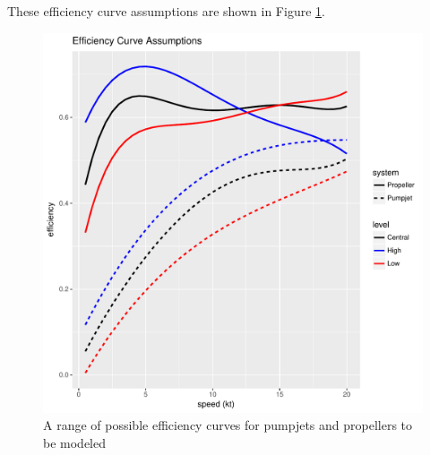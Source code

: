\documentclass{article}\usepackage[]{graphicx}\usepackage[]{color}
\makeatletter
\def\maxwidth{ %
  \ifdim\Gin@nat@width>\linewidth
    \linewidth
  \else
    \Gin@nat@width
  \fi
}
\newenvironment{knitrout}{}{} %
\makeatother
\begin{document}
These efficiency curve assumptions are shown in Figure \ref{fig:Efficiency_assumptions}.

\begin{figure}
\begin{knitrout}
\color{fgcolor}

{\centering \includegraphics[width=\maxwidth]{figures/plots-plot_efficiency-1} 

}



\end{knitrout}
\caption{A range of possible efficiency curves for pumpjets and propellers to be modeled}
\label{fig:Efficiency_assumptions}
\end{figure}
\end{document}
